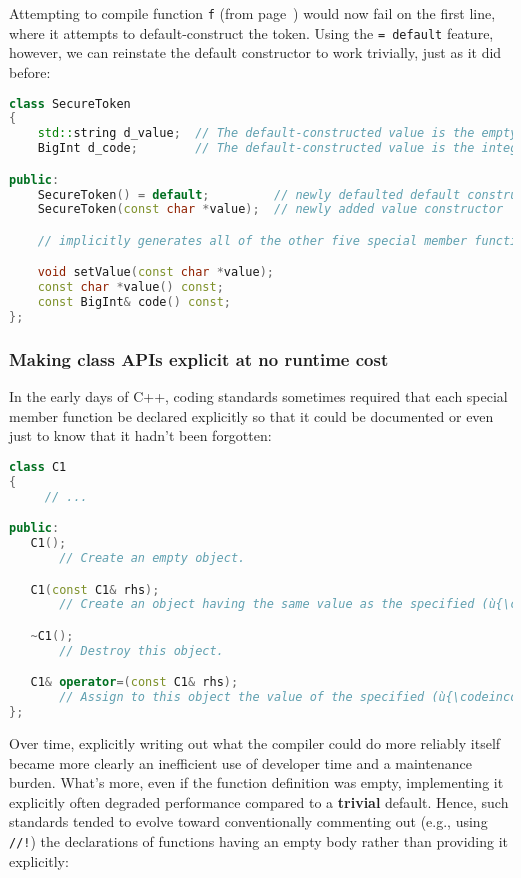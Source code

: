 \noindent Attempting to compile function \texttt{f} (from page~\pageref{default-voidf-code}) would now fail on the
first line, where it attempts to default-construct the token. Using
the \texttt{=}~\texttt{default} feature, however, we can reinstate the
default constructor to work trivially, just as
it did before:

\begin{lstlisting}[language=C++]
class SecureToken
{
    std::string d_value;  // The default-constructed value is the empty string.
    BigInt d_code;        // The default-constructed value is the integer zero.

public:
    SecureToken() = default;         // newly defaulted default constructor
    SecureToken(const char *value);  // newly added value constructor

    // implicitly generates all of the other five special member functions

    void setValue(const char *value);
    const char *value() const;
    const BigInt& code() const;
};
\end{lstlisting}


\subsubsection[Making class APIs explicit at no runtime cost]{Making class APIs explicit at no runtime cost}\label{making-class-apis-explicit-at-no-runtime-cost}

In the early days of C++, coding standards sometimes
required that each special member function be declared explicitly so
that it could be documented or even just to know that it hadn't been
forgotten:

\begin{lstlisting}[language=C++]
class C1
{
     // ...

public:
   C1();
       // Create an empty object.

   C1(const C1& rhs);
       // Create an object having the same value as the specified (ù{\codeincomments{rhs}}ù) object.

   ~C1();
       // Destroy this object.

   C1& operator=(const C1& rhs);
       // Assign to this object the value of the specified (ù{\codeincomments{rhs}}ù) object.
};
\end{lstlisting}

\noindent Over time, explicitly writing out what the compiler
could do more reliably itself became more clearly an inefficient use of developer time and a maintenance burden.
What's more, even if the function definition was empty, implementing it
explicitly often degraded performance compared to a \textbf{trivial} default. Hence, such
standards tended to evolve toward conventionally commenting out (e.g.,
using \texttt{//!}) the declarations of functions having an empty
body rather than providing it explicitly:

